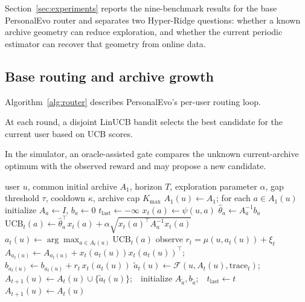 \documentclass{article} %
\begin{document}
Section~\ref{sec:experiments} reports the nine-benchmark results for the base
PersonalEvo router and separates two Hyper-Ridge questions: whether a known
archive geometry can reduce exploration, and whether the current periodic
estimator can recover that geometry from online data.

\subsection{Base routing and archive growth}

Algorithm~\ref{alg:router} describes PersonalEvo's per-user routing loop.

At each round, a disjoint LinUCB bandit selects the best candidate for the current user based on UCB scores.

In the simulator, an oracle-assisted gate compares the unknown current-archive optimum with the observed reward and may propose a new candidate.

\begin{algorithm}[t]
\caption{Per-user personalized routing over a growing archive.}
\label{alg:router}
\begin{algorithmic}[1]
\Require user $u$, common initial archive $A_1$, horizon $T$, exploration parameter $\alpha$, gap threshold $\tau$, cooldown $\kappa$, archive cap $K_{\max}$
\State $A_1(u) \gets A_1$; for each $a \in A_1(u)$ initialize $A_a \gets I$, $b_a \gets 0$
\State $t_{\mathrm{last}} \gets -\infty$
        \State $x_t(a) \gets \psi(u,a)$ 
        \State $\hat\theta_a \gets A_a^{-1} b_a$
        \State $\mathrm{UCB}_t(a) \gets \hat\theta_a^\top x_t(a) + \alpha \sqrt{x_t(a)^\top A_a^{-1} x_t(a)}$
    \EndFor
    \State $a_t(u) \gets \arg\max_{a \in A_t(u)} \mathrm{UCB}_t(a)$
    \State observe $r_t = \mu(u, a_t(u)) + \xi_t$
    \State $A_{a_t(u)} \gets A_{a_t(u)} + x_t(a_t(u)) x_t(a_t(u))^\top$;\quad $b_{a_t(u)} \gets b_{a_t(u)} + r_t \, x_t(a_t(u))$
     
        \State $\tilde a_t(u) \gets \mathcal{F}(u, A_t(u), \mathrm{trace}_t)$;\ \ $A_{t+1}(u) \gets A_t(u) \cup \{\tilde a_t(u)\}$;\ \ initialize $A_{\tilde a}, b_{\tilde a}$;\ \ $t_{\mathrm{last}} \gets t$
    \Else
        \State $A_{t+1}(u) \gets A_t(u)$
    \EndIf
\EndFor
\end{algorithmic}
\end{algorithm}
\end{document}
